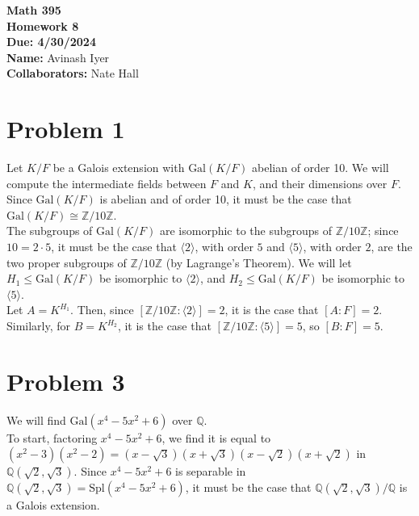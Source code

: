 \documentclass[10pt]{extarticle}
\title{}
\author{}
\date{}
\newcommand{\Q}{\mathbb{Q}}
\newcommand{\Z}{\mathbb{Z}}
\begin{document}
  \begin{center}
    {\bf \Large Math 395 \\[0.1in]Homework 8 \\[0.1in]
    Due: 4/30/2024}\\[.25in]
    {\bf Name:} {Avinash Iyer}\\[0.15in]
    {\bf Collaborators:} {Nate Hall} \\
  \end{center}
  \section{Problem 1}%
  Let $K/F$ be a Galois extension with $\text{Gal}(K/F)$ abelian of order 10. We will compute the intermediate fields between $F$ and $K$, and their dimensions over $F$.\\

    Since $\text{Gal}(K/F)$ is abelian and of order 10, it must be the case that $\text{Gal}(K/F)\cong \Z/10\Z$.\\

  The subgroups of $\text{Gal}(K/F)$ are isomorphic to the subgroups of $\Z/10\Z$; since $10 = 2\cdot 5$, it must be the case that $\langle 2 \rangle$, with order $5$ and $\langle 5 \rangle$, with order $2$, are the two proper subgroups of $\Z/10\Z$ (by Lagrange's Theorem). We will let $H_1 \leq \text{Gal}(K/F)$ be isomorphic to $\langle 2 \rangle$, and $H_2 \leq \text{Gal}(K/F)$ be isomorphic to $\langle 5 \rangle$.\\

  Let $A = K^{H_1}$. Then, since $[\Z/10\Z : \langle 2 \rangle] = 2$, it is the case that $[A:F] = 2$. Similarly, for $B = K^{H_2}$, it is the case that $[\Z/10\Z : \langle 5 \rangle] = 5$, so $[B:F] = 5$.
  \section{Problem 3}%
  We will find $\text{Gal}(x^4 - 5x^2 + 6)$ over $\Q$.\\

  To start, factoring $x^4 - 5x^2 + 6$, we find it is equal to $(x^2 - 3)(x^2 - 2) = (x-\sqrt{3})(x+\sqrt{3})(x-\sqrt{2})(x+\sqrt{2})$ in $\Q(\sqrt{2},\sqrt{3})$. Since $x^4 - 5x^2 + 6$ is separable in $\Q(\sqrt{2},\sqrt{3}) = \text{Spl}(x^4 - 5x^2 + 6)$, it must be the case that $\Q(\sqrt{2},\sqrt{3})/\Q$ is a Galois extension.\\
\end{document}
